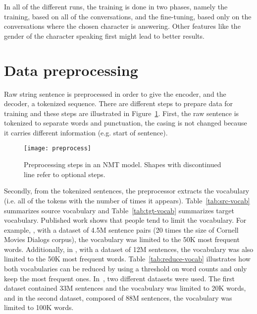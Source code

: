 In all of the different runs, the training is done in two phases, namely the training, based on all of the conversations, and the fine-tuning, based only on the conversations where the chosen character is answering. Other features like the gender of the character speaking first might lead to better results.


\section{Data preprocessing}
Raw string sentence is preprocessed in order to give the encoder, and the decoder, a tokenized sequence. There are different steps to prepare data for training and these steps are illustrated in Figure~\ref{fig:preprocess}. First, the raw sentence is tokenized to separate words and punctuation, the casing is not changed because it carries different information (e.g. start of sentence).

\begin{figure}
    \centering
    \texttt{[image: preprocess]}
    \decoRule
    \caption[Preprocessing steps in NMT]{Preprocessing steps in an NMT model. Shapes with discontinued line refer to optional steps.}
    \label{fig:preprocess}
\end{figure}

Secondly, from the tokenized sentences, the preprocessor extracts the vocabulary (i.e. all of the tokens with the number of times it appears). Table~\ref{tab:src-vocab} summarizes source vocabulary and Table~\ref{tab:tgt-vocab} summarizes target vocabulary.
Published work shows that people tend to limit the vocabulary. For example, \citet{1508.04025}, with a dataset of 4.5M sentence pairs (20 times the size of Cornell Movies Dialogs corpus), the vocabulary was limited to the 50K most frequent words. Additionally, in \citet{1506.06714}, with a dataset of 12M sentences, the vocabulary was also limited to the 50K most frequent words.
Table~\ref{tab:reduce-vocab} illustrates how both vocabularies can be reduced by using a threshold on word counts and only keep the most frequent ones.
In~\citet{1506.05869}, two different datasets were used. The first dataset contained 33M sentences and the vocabulary was limited to 20K words, and in the second dataset, composed of 88M sentences, the vocabulary was limited to 100K words.

